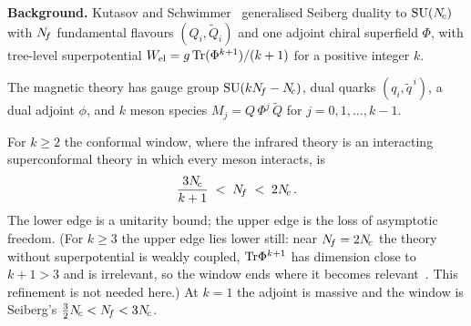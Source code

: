\documentclass[11pt,a4paper]{article}
\begin{document}
\noindent\textbf{Background.}
Kutasov and Schwimmer~\cite{KS9505004} generalised Seiberg duality to
$\mathrm{SU}(N_{\!c})$ with $N_{\!f}$ fundamental flavours $(Q_i, \widetilde{Q}_i)$ and
one adjoint chiral superfield $\Phi$, with tree-level superpotential
$W_{\text{el}} = g\,\mathrm{Tr}(\Phi^{k+1})/(k+1)$ for a positive integer $k$.

The magnetic theory has gauge group $\mathrm{SU}(kN_{\!f} - N_{\!c})$, dual quarks
$(q_i, \widetilde{q}^{\,i})$, a dual adjoint $\phi$, and $k$ meson
species $M_j = Q\,\Phi^j\,\widetilde{Q}$ for $j = 0, 1, \ldots, k-1$.

For $k \geq 2$ the conformal window, where the infrared theory is an
interacting superconformal theory in which every meson interacts, is
\begin{equation}\label{eq:KS-window-ex}
  \frac{3N_{\!c}}{k+1} \;<\; N_{\!f} \;<\; 2N_{\!c}\,.
\end{equation}
The lower edge is a unitarity bound; the upper edge is the loss of
asymptotic freedom.  (For $k \geq 3$ the upper edge lies lower still:
near $N_{\!f} = 2N_{\!c}$ the theory without superpotential is weakly coupled,
$\mathrm{Tr}\Phi^{k+1}$ has dimension close to $k+1 > 3$ and is irrelevant, so
the window ends where it becomes relevant~\cite{Kutasov2003}.  This
refinement is not needed here.)  At $k = 1$ the adjoint is massive and
the window is Seiberg's $\tfrac{3}{2}N_{\!c} < N_{\!f} < 3N_{\!c}$.

\medskip
\end{document}
